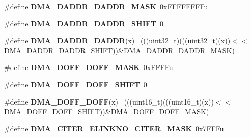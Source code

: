 \begin{DoxyCompactItemize}
\item 
\hypertarget{group___d_m_a___register___masks_ga48e5c0ccc5f7c71ee28906182a7ff94c}{}\#define {\bfseries D\+M\+A\+\_\+\+D\+A\+D\+D\+R\+\_\+\+D\+A\+D\+D\+R\+\_\+\+M\+A\+S\+K}~0x\+F\+F\+F\+F\+F\+F\+F\+Fu\label{group___d_m_a___register___masks_ga48e5c0ccc5f7c71ee28906182a7ff94c}

\item 
\hypertarget{group___d_m_a___register___masks_ga807c49b547c5b45c106ddc9f99a791c3}{}\#define {\bfseries D\+M\+A\+\_\+\+D\+A\+D\+D\+R\+\_\+\+D\+A\+D\+D\+R\+\_\+\+S\+H\+I\+F\+T}~0\label{group___d_m_a___register___masks_ga807c49b547c5b45c106ddc9f99a791c3}

\item 
\hypertarget{group___d_m_a___register___masks_gaec2d1700f192f55ff3666364b08e7be6}{}\#define {\bfseries D\+M\+A\+\_\+\+D\+A\+D\+D\+R\+\_\+\+D\+A\+D\+D\+R}(x)                                          ~(((uint32\+\_\+t)(((uint32\+\_\+t)(x))$<$$<$D\+M\+A\+\_\+\+D\+A\+D\+D\+R\+\_\+\+D\+A\+D\+D\+R\+\_\+\+S\+H\+I\+F\+T))\&D\+M\+A\+\_\+\+D\+A\+D\+D\+R\+\_\+\+D\+A\+D\+D\+R\+\_\+\+M\+A\+S\+K)\label{group___d_m_a___register___masks_gaec2d1700f192f55ff3666364b08e7be6}

\item 
\hypertarget{group___d_m_a___register___masks_gac1132370cf369d1591e78a45fca94abc}{}\#define {\bfseries D\+M\+A\+\_\+\+D\+O\+F\+F\+\_\+\+D\+O\+F\+F\+\_\+\+M\+A\+S\+K}~0x\+F\+F\+F\+Fu\label{group___d_m_a___register___masks_gac1132370cf369d1591e78a45fca94abc}

\item 
\hypertarget{group___d_m_a___register___masks_gaeef657c3fd58c5d70e0d4934da146eb2}{}\#define {\bfseries D\+M\+A\+\_\+\+D\+O\+F\+F\+\_\+\+D\+O\+F\+F\+\_\+\+S\+H\+I\+F\+T}~0\label{group___d_m_a___register___masks_gaeef657c3fd58c5d70e0d4934da146eb2}

\item 
\hypertarget{group___d_m_a___register___masks_ga86bf69c38e3558817576793776e58038}{}\#define {\bfseries D\+M\+A\+\_\+\+D\+O\+F\+F\+\_\+\+D\+O\+F\+F}(x)                                              ~(((uint16\+\_\+t)(((uint16\+\_\+t)(x))$<$$<$D\+M\+A\+\_\+\+D\+O\+F\+F\+\_\+\+D\+O\+F\+F\+\_\+\+S\+H\+I\+F\+T))\&D\+M\+A\+\_\+\+D\+O\+F\+F\+\_\+\+D\+O\+F\+F\+\_\+\+M\+A\+S\+K)\label{group___d_m_a___register___masks_ga86bf69c38e3558817576793776e58038}

\item 
\hypertarget{group___d_m_a___register___masks_ga2e735a50b1a3e8dd35e863ccb9932dc2}{}\#define {\bfseries D\+M\+A\+\_\+\+C\+I\+T\+E\+R\+\_\+\+E\+L\+I\+N\+K\+N\+O\+\_\+\+C\+I\+T\+E\+R\+\_\+\+M\+A\+S\+K}~0x7\+F\+F\+Fu\label{group___d_m_a___register___masks_ga2e735a50b1a3e8dd35e863ccb9932dc2}


\end{DoxyCompactItemize}

